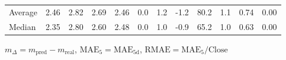 \begin{threeparttable}
{\begin{tabular}{lrrrrrrrrrrr}
Average &          2.46 &          2.82 &          2.69 &        2.46 &                 0.0 &                 1.2 &       -1.2 &                80.2 &              1.1 &            0.74 &                   0.00 \\
 Median &          2.35 &          2.80 &          2.60 &        2.48 &                 0.0 &                 1.0 &       -0.9 &                65.2 &              1.0 &            0.63 &                   0.00 \\
\bottomrule
\end{tabular}
}
\begin{tablenotes}\footnotesize
\item $m_\Delta=m_{\text{pred}}-m_{\text{real}}$,
$\mathrm{MAE}_5=\mathrm{MAE}_{5\text{d}}$,
$\mathrm{RMAE}=\mathrm{MAE}_5/\text{Close}$
\end{tablenotes}
\end{threeparttable}
\endgroup

